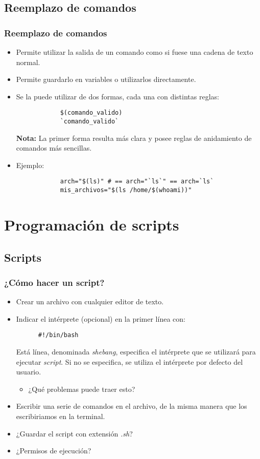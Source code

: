 \subsection{Reemplazo de comandos}
\begin{frame}[fragile]
	\frametitle{Reemplazo de comandos}
	\begin{itemize}
		\item Permite utilizar la salida de un comando como si fuese una cadena de texto normal.
		\item Permite guardarlo en variables o utilizarlos directamente.
		\item Se la puede utilizar de dos formas, cada una con distintas reglas:
		\begin{lstlisting}
			$(comando_valido)‏
			`comando_valido`
		\end{lstlisting}
		\textbf{Nota:} La primer forma resulta más clara y posee reglas de anidamiento de comandos más sencillas.
		\item Ejemplo:
		\begin{lstlisting}
			arch="$(ls)" # == arch="`ls`" == arch=`ls`
			mis_archivos="$(ls /home/$(whoami))"
		\end{lstlisting}
	\end{itemize}
\end{frame}

\section{Programación de scripts}
\subsection{Scripts}
\begin{frame}[fragile]
  \frametitle{¿Cómo hacer un script?}
  \begin{itemize}
  \item Crear un archivo con cualquier editor de texto.
    \pause
  \item Indicar el intérprete (opcional) en la primer línea con:
    \begin{lstlisting}
      #!/bin/bash
    \end{lstlisting}
    Está línea, denominada \textit{shebang}, especifica el intérprete
    que se utilizará para ejecutar \textit{script}. Si no se
    especifica, se utiliza el intérprete por defecto del usuario.
    \begin{itemize}
      \pause
    \item   ¿Qué problemas puede traer esto?
    \end{itemize}
    \pause
  \item Escribir una serie de comandos en el archivo, de la misma manera
    que los escribiriamos en la terminal.
    \pause
  \item ¿Guardar el script con extensión \textit{.sh}?
    \pause
  \item ¿Permisos de ejecución?
  \end{itemize}
\end{frame}

